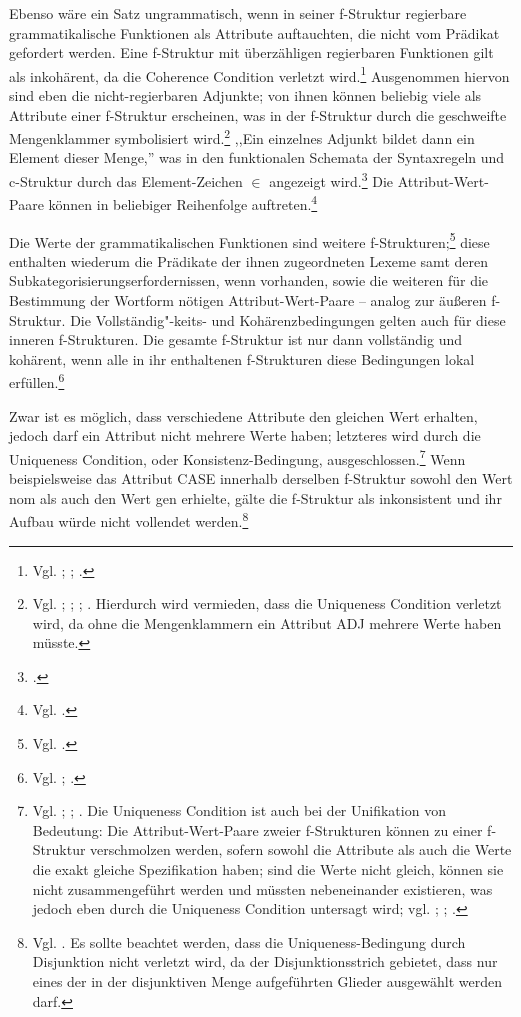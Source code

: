 \documentclass[12pt,a4paper]{article}
\begin{document}
Ebenso wäre ein Satz ungrammatisch, wenn in seiner f-Struktur regierbare grammatikalische Funktionen als Attribute auftauchten, die nicht vom Prädikat gefordert werden. Eine f-Struktur mit überzähligen regierbaren Funktionen gilt als inkohärent, da die Coherence Condition verletzt wird.\footnote{Vgl. \cite[59-62]{Falk}; \cite[29; 39]{Rohrer}; \cite[20]{Skript}.} Ausgenommen hiervon sind eben die nicht-regierbaren Adjunkte; von ihnen können beliebig viele als Attribute einer f-Struktur erscheinen, was in der f-Struktur durch die geschweifte Mengenklammer symbolisiert wird.\footnote{Vgl. \cite[61; 72]{Falk}; \cite[12]{Dal}; \cite[28]{Rohrer}; \cite[38-40]{Skript}. Hierdurch wird vermieden, dass die Uniqueness Condition verletzt wird, da ohne die Mengenklammern ein Attribut ADJ mehrere Werte haben müsste.} ,,Ein einzelnes Adjunkt bildet dann ein Element dieser Menge,'' was in den funktionalen Schemata der Syntaxregeln und c-Struktur durch das Element-Zeichen $\in$ angezeigt wird.\footnote{ \cite[39]{Skript}.} Die Attribut-Wert-Paare können in beliebiger Reihenfolge auftreten.\footnote{Vgl. \cite[35]{Rohrer}.}

Die Werte der grammatikalischen Funktionen sind weitere f-Strukturen;\footnote{Vgl. \cite[35]{Rohrer}.} diese enthalten wiederum die Prädikate der ihnen zugeordneten Lexeme samt deren Subkategorisierungserfordernissen, wenn vorhanden, sowie die weiteren für die Bestimmung der Wortform nötigen Attribut-Wert-Paare -- analog zur äußeren f-Struktur. Die Vollständig"-keits- und Kohärenzbedingungen gelten auch für diese inneren f-Strukturen. Die gesamte f-Struktur ist nur dann vollständig und kohärent, wenn alle in ihr enthaltenen f-Strukturen diese Bedingungen lokal erfüllen.\footnote{Vgl. \cite[60]{Falk}; \cite[19-21]{Skript}.}

Zwar ist es möglich, dass verschiedene Attribute den gleichen Wert erhalten, jedoch darf ein Attribut nicht mehrere Werte haben; letzteres wird durch die Uniqueness Condition, oder Konsistenz-Bedingung, ausgeschlossen.\footnote{Vgl. \cite[62]{Falk}; \cite[29]{Rohrer}; \cite[18-9]{Skript}. Die Uniqueness Condition ist auch bei der Unifikation von Bedeutung: Die Attribut-Wert-Paare zweier f-Strukturen können zu einer f-Struktur verschmolzen werden, sofern sowohl die Attribute als auch die Werte die exakt gleiche Spezifikation haben; sind die Werte nicht gleich, können sie nicht zusammengeführt werden und müssten nebeneinander existieren, was jedoch eben durch die Uniqueness Condition untersagt wird; vgl. \cite[68]{Falk}; \cite[37]{Rohrer}; \cite[18-9]{Skript}.} Wenn beispielsweise das Attribut CASE innerhalb derselben f-Struktur sowohl den Wert nom als auch den Wert gen erhielte, gälte die f-Struktur als inkonsistent und ihr Aufbau würde nicht vollendet werden.\footnote{Vgl. \cite[29; 35]{Rohrer}. Es sollte beachtet werden, dass die Uniqueness-Bedingung durch Disjunktion nicht verletzt wird, da der Disjunktionsstrich gebietet, dass nur eines der in der disjunktiven Menge aufgeführten Glieder ausgewählt werden darf.} 
\end{document}
